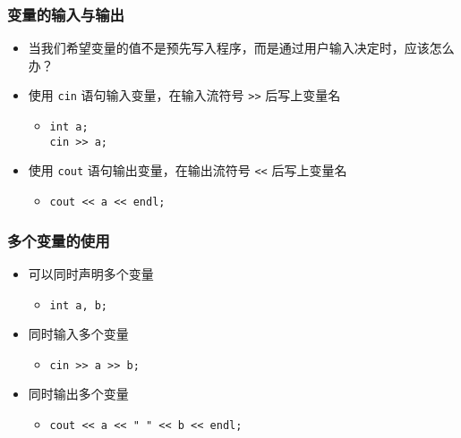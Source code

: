 \begin{frame}[fragile]
    \frametitle{变量的输入与输出}

    \begin{itemize}
        \item<1-> 当我们希望变量的值不是预先写入程序，而是通过用户输入决定时，应该怎么办？

        \item<2-> 使用 \lstinline|cin| 语句输入变量，在输入流符号 \lstinline|>>| 后写上变量名

            \begin{itemize}
                \item
                    \lstinline|int a;|\\
                    \lstinline|cin >> a;|
            \end{itemize}

        \item<3-> 使用 \lstinline|cout| 语句输出变量，在输出流符号 \lstinline|<<| 后写上变量名

            \begin{itemize}
                \item \lstinline|cout << a << endl;|
            \end{itemize}

    \end{itemize}
\end{frame}

\begin{frame}[fragile]
    \frametitle{多个变量的使用}

    \begin{itemize}
        \item<1-> 可以同时声明多个变量

            \begin{itemize}
                \item \lstinline|int a, b;|
            \end{itemize}

        \item<2-> 同时输入多个变量

            \begin{itemize}
                \item \lstinline|cin >> a >> b;|
            \end{itemize}

        \item<3-> 同时输出多个变量

            \begin{itemize}
                \item \lstinline|cout << a << " " << b << endl;|
            \end{itemize}

    \end{itemize}
\end{frame}

